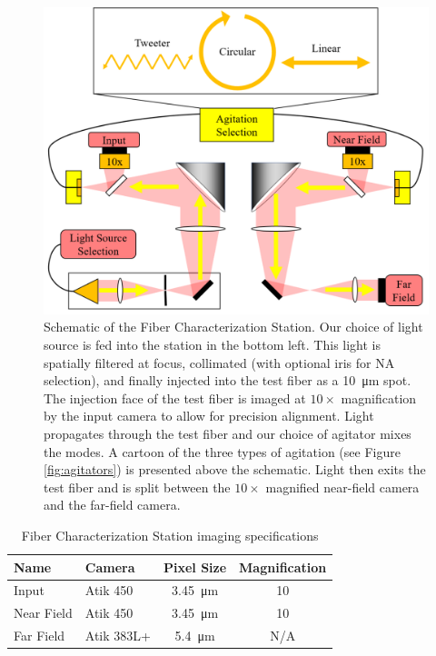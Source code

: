 \begin{figure}
\centering
	\includegraphics[width=.9\columnwidth]{figures-2/fcs_schematic.pdf}
	\caption[Schematic of the Fiber Characterization Station]{Schematic of the Fiber Characterization Station. Our choice of light source is fed into the station in the bottom left. This light is spatially filtered at focus, collimated (with optional iris for NA selection), and finally injected into the test fiber as a \SI{10}{\micro\meter} spot. The injection face of the test fiber is imaged at $10\times$ magnification by the input camera to allow for precision alignment. Light propagates through the test fiber and our choice of agitator mixes the modes. A cartoon of the three types of agitation (see Figure \ref{fig:agitators}) is presented above the schematic. Light then exits the test fiber and is split between the $10\times$ magnified near-field camera and the far-field camera.}
\label{fig:fcs}
\end{figure}

\begin{table}
\centering
\caption{Fiber Characterization Station imaging specifications}
	\begin{tabular}{llcc}
	\hline
	Name & Camera & Pixel Size & Magnification \\
	\hline \hline
	Input & Atik 450 & \SI{3.45}{\micro\meter} & 10 \\
	\hline
	Near Field & Atik 450 & \SI{3.45}{\micro\meter} & 10 \\
	\hline
	Far Field & Atik 383L+ & \SI{5.4}{\micro\meter} & N/A \\
	\hline	
	\end{tabular}
\label{table:cameras}
\end{table}

